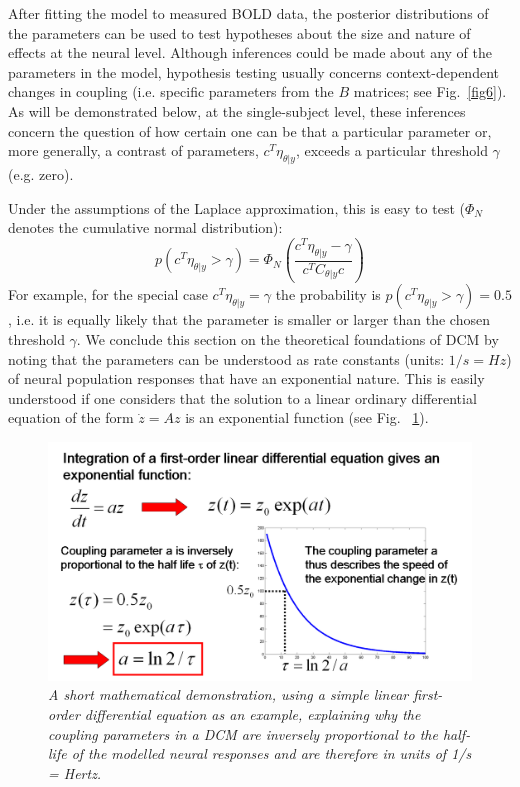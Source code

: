 After fitting the model to measured BOLD data, the posterior distributions of the parameters can be used to test hypotheses about the size and nature of effects at the neural level.  Although inferences could be made about any of the parameters in the model, hypothesis testing usually concerns context-dependent changes in coupling (i.e. specific parameters from the $B$ matrices; see Fig.~\ref{fig6}).  As will be demonstrated below, at the single-subject level, these inferences concern the question of how certain one can be that a particular parameter or, more generally, a contrast of parameters, $c^T \eta_{\theta | y}$, exceeds a particular threshold  $\gamma$ (e.g. zero).

Under the assumptions of the Laplace approximation, this is easy to test ($\Phi_N$ denotes the cumulative normal distribution):
\begin{equation}
p(c^T \eta_{\theta | y} > \gamma) = \Phi_N \left(\frac{c^T \eta_{\theta | y} - \gamma}{c^T C_{\theta | y} c} \right)
\end{equation}
For example, for the special case $c^T \eta_{\theta | y} = \gamma$ the probability is $p(c^T \eta_{\theta | y} > \gamma)=0.5$, i.e. it is equally likely that the parameter is smaller or larger than the chosen threshold $\gamma$.
We conclude this section on the theoretical foundations of DCM by noting that the parameters can be understood as rate constants (units: $1/s = Hz$) of neural population responses that have an exponential nature.  This is easily understood if one considers that the solution to a linear ordinary differential equation of the form $\dot{z}=Az$ is an exponential function (see Fig. ~\ref{fig3}). 
\begin{figure}[ht]
\begin{center}
\includegraphics[width=120mm]{dcm/Fig3}
\caption{\em A short mathematical demonstration, using a simple linear first-order differential equation as an example, explaining why the coupling parameters in a DCM are inversely proportional to the half-life of the modelled neural responses and are therefore in units of 1/s = Hertz.\label{fig3}}
\end{center}
\end{figure}

